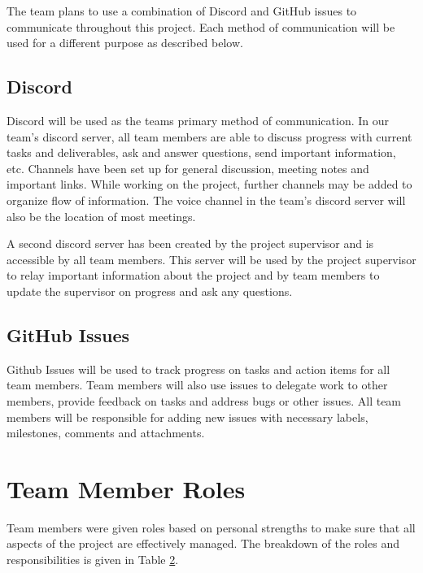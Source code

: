 \documentclass{article}
\begin{document}
The team plans to use a combination of Discord and GitHub issues to communicate throughout this project. Each method of communication will be used for a different purpose as described below.

\subsection{Discord}

Discord will be used as the teams primary method of communication. In our team's discord server, all team members are able to discuss progress with current tasks and deliverables, ask and answer questions, send important information, etc. Channels have been set up for general discussion, meeting notes and important links. While working on the project, further channels may be added to organize flow of information. The voice channel in the team's discord server will also be the location of most meetings.

A second discord server has been created by the project supervisor and is accessible by all team members. This server will be used by the project supervisor to relay important information about the project and by team members to update the supervisor on progress and ask any questions.

\subsection{GitHub Issues}

Github Issues will be used to track progress on tasks and action items for all team members. Team members will also use issues to delegate work to other members, provide feedback on tasks and address bugs or other issues. All team members will be responsible for adding new issues with necessary labels, milestones, comments and attachments.

\section{Team Member Roles}

Team members were given roles based on personal strengths to make sure that all aspects of the project are effectively managed. The breakdown of the roles and responsibilities is given in Table \hyperref[tab:teamRoles]{2}.
\end{document}
